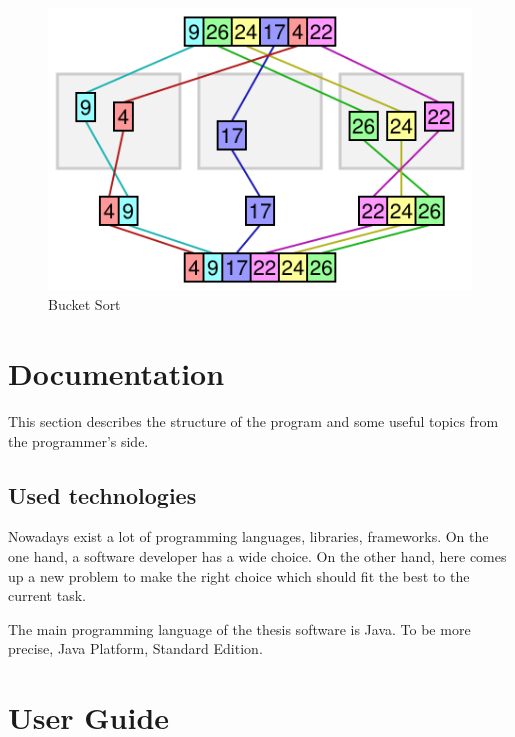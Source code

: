 \documentclass[
  field=inf,
  biblatex,
  language=english,
  glossaries,
  index
]{kidiplom}
\begin{document}
\begin{figure}[H]
\begin{center}
	
	\includegraphics[scale=0.5]{img/Bucketsort.png}
	\caption{Bucket Sort}\label{fig:radixsort}
\end{center}
\end{figure}

\newpage
\section{Documentation}

This section describes the structure of the program and some useful topics from the programmer's side. 

\subsection{Used technologies}

Nowadays exist a lot of programming languages, libraries, frameworks. On the one hand, a software developer has a wide choice. On the other hand, here comes up a new problem to make the right choice which should fit the best to the current task.

The main programming language of the thesis software is Java. To be more precise, Java Platform, Standard Edition. 


\newpage
\section{User Guide}
\end{document}
